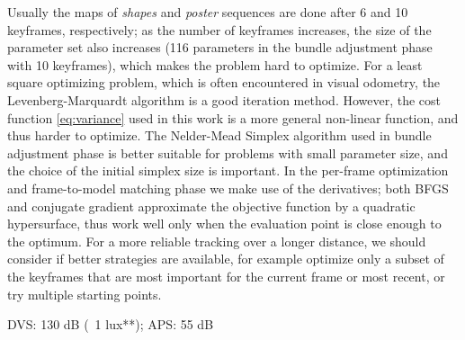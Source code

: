 Usually the maps of \emph{shapes} and \emph{poster} sequences are done
after 6 and 10 keyframes, respectively; as the number of keyframes
increases, the size of the parameter set also increases (116
parameters in the bundle adjustment phase with 10 keyframes), which
makes the problem hard to optimize. For a least square optimizing
problem, which is often encountered in visual odometry, the
Levenberg-Marquardt algorithm\citep{press1988numerical} is a good
iteration method. However, the cost function \cref{eq:variance} used
in this work is a more general non-linear function, and thus harder to
optimize. The Nelder-Mead Simplex algorithm\citep{nelder1965simplex}
used in bundle adjustment phase is better suitable for problems with
small parameter size, and the choice of the initial simplex size is
important. In the per-frame optimization and frame-to-model matching
phase we make use of the derivatives; both BFGS and conjugate gradient
approximate the objective function by a quadratic hypersurface, thus
work well only when the evaluation point is close enough to the
optimum. For a more reliable tracking over a longer distance, we
should consider if better strategies are available, for example
optimize only a subset of the keyframes that are most important for
the current frame or most recent, or try multiple starting points.

DVS: 130 dB (~1 lux**); APS: 55 dB
